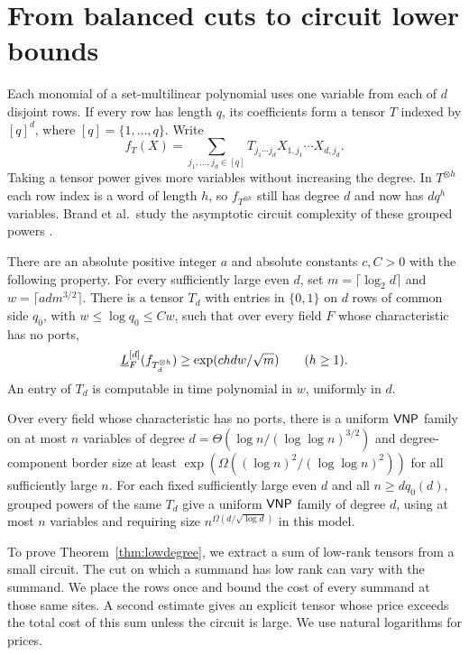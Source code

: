 \section{From balanced cuts to circuit lower bounds}\label{sec:comparison}

Each monomial of a set-multilinear polynomial uses one variable from
each of $d$ disjoint rows. If every row has length $q$, its coefficients form a
tensor $T$ indexed by $[q]^d$, where $[q]=\{1,\ldots,q\}$. Write
\[
 f_T(X)=\sum_{j_1,\ldots,j_d\in[q]} T_{j_1\cdots j_d}
                    X_{1,j_1}\cdots X_{d,j_d}.
\]
Taking a tensor power gives more variables without increasing the
degree. In $T^{\otimes h}$ each row index is a word of length $h$, so
$f_{T^{\otimes h}}$ still has degree $d$ and now has $dq^h$ variables. Brand et al.\ study the
asymptotic circuit complexity of these grouped powers \cite{BrandMany}.

\begin{theorem}\label{thm:lowdegree}
There are an absolute positive integer $a$ and absolute constants $c,C>0$
with the following property. For every sufficiently large even $d$, set
$m=\lceil\log_2 d\rceil$ and $w=\lceil a d m^{3/2}\rceil$. There is a
tensor $T_d$ with entries in $\{0,1\}$ on $d$ rows of common side $q_0$,
with $w\le\log q_0\le Cw$, such that over every field $F$ whose
characteristic has no ports,
\[
  \underline L_F^{[d]}(f_{T_d^{\otimes h}})
       \ge \exp(c h d w/\sqrt m) \qquad(h\ge1).
\]
An entry of $T_d$ is computable in time polynomial in $w$, uniformly in $d$.
\end{theorem}

\begin{corollary}\label{cor:variable-budget}
Over every field whose characteristic has no ports, there is a uniform
$\mathsf{VNP}$ family on at most $n$ variables of degree
$d=\Theta(\log n/(\log\log n)^{3/2})$ and degree-component border size
at least $\exp(\Omega((\log n)^2/(\log\log n)^2))$ for all sufficiently
large $n$. For each fixed sufficiently large even $d$ and all
$n\ge d q_0(d)$, grouped powers of the same $T_d$ give a uniform
$\mathsf{VNP}$ family of degree $d$, using at most $n$ variables and requiring
size $n^{\Omega(d/\sqrt{\log d})}$ in this model.
\end{corollary}

To prove Theorem~\ref{thm:lowdegree}, we extract a sum of low-rank
tensors from a small circuit. The cut on which a summand has low rank
can vary with the summand. We place the rows once and bound the cost
of every summand at those same sites. A second estimate gives an
explicit tensor whose price exceeds the total cost of this sum unless
the circuit is large. We use natural logarithms for prices.


